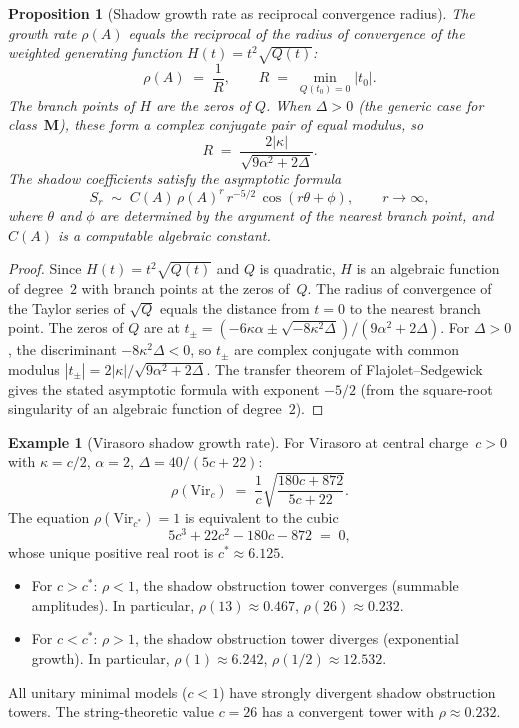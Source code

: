 \documentclass[11pt]{article}
\theoremstyle{plain}
\newtheorem{proposition}[theorem]{Proposition}
\theoremstyle{definition}
\newtheorem{example}[theorem]{Example}
\theoremstyle{remark}
\begin{document}
\begin{proposition}[Shadow growth rate as reciprocal convergence radius]
\label{prop:rho-convergence}
The growth rate $\rho(A)$ equals the reciprocal of the
radius of convergence of the weighted generating function
$H(t) = t^2\sqrt{Q(t)}$:
\[
 \rho(A) \;=\; \frac{1}{R},
 \qquad
 R \;=\; \min_{Q(t_0)=0} |t_0|.
\]
The branch points of $H$ are the zeros of $Q$. When
$\Delta > 0$ (the generic case for class~$\mathbf{M}$),
these form a complex conjugate pair of equal modulus, so
\[
 R
 \;=\;
 \frac{2|\kappa|}{\sqrt{9\alpha^2 + 2\Delta}}.
\]
The shadow coefficients satisfy the asymptotic formula
\[
 S_r
 \;\sim\;
 C(A)\,\rho(A)^r\,r^{-5/2}\,\cos(r\theta + \phi),
 \qquad r \to \infty,
\]
where $\theta$ and $\phi$ are determined by the argument
of the nearest branch point, and $C(A)$ is a computable
algebraic constant.
\end{proposition}

\begin{proof}
Since $H(t) = t^2\sqrt{Q(t)}$ and $Q$ is quadratic, $H$
is an algebraic function of degree~$2$ with branch points
at the zeros of~$Q$. The radius of convergence of the
Taylor series of $\sqrt{Q}$ equals the distance from
$t = 0$ to the nearest branch point. The zeros of $Q$
are at
$t_{\pm} = (-6\kappa\alpha \pm \sqrt{-8\kappa^2\Delta})/
(9\alpha^2 + 2\Delta)$.
For $\Delta > 0$, the discriminant
$-8\kappa^2\Delta < 0$, so $t_{\pm}$ are complex
conjugate with common modulus
$|t_{\pm}| = 2|\kappa|/\sqrt{9\alpha^2 + 2\Delta}$.
The transfer theorem of Flajolet--Sedgewick gives the
stated asymptotic formula with exponent $-5/2$
(from the square-root singularity of an algebraic
function of degree~$2$).
\end{proof}

\begin{example}[Virasoro shadow growth rate]
\label{ex:virasoro-rho}
For Virasoro at central charge~$c > 0$ with $\kappa = c/2$,
$\alpha = 2$, $\Delta = 40/(5c+22)$:
\[
 \rho(\mathrm{Vir}_c)
 \;=\;
 \frac{1}{c}\sqrt{\frac{180c + 872}{5c + 22}}.
\]
The equation $\rho(\mathrm{Vir}_{c^*}) = 1$ is equivalent
to the cubic
\begin{equation}\label{eq:critical-cubic}
 5c^3 + 22c^2 - 180c - 872 \;=\; 0,
\end{equation}
whose unique positive real root is
$c^* \approx 6.125$.
\begin{itemize}
\item For $c > c^*$: $\rho < 1$, the shadow obstruction tower converges
 (summable amplitudes). In particular, $\rho(13) \approx
 0.467$, $\rho(26) \approx 0.232$.
\item For $c < c^*$: $\rho > 1$, the shadow obstruction tower diverges
 (exponential growth). In particular,
 $\rho(1) \approx 6.242$, $\rho(1/2) \approx 12.532$.
\end{itemize}
All unitary minimal models ($c < 1$) have strongly
divergent shadow obstruction towers. The string-theoretic value
$c = 26$ has a convergent tower with $\rho \approx 0.232$.
\end{example}
\end{document}
